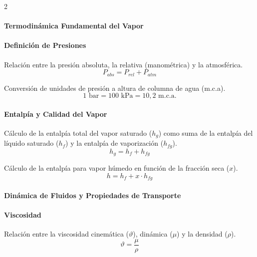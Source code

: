 \documentclass[11pt]{article}
\begin{document}
\begin{multicols*}{2}
    \paragraph*{Termodinámica Fundamental del Vapor}
    
    \paragraph*{Definición de Presiones}
    Relación entre la presión absoluta, la relativa (manométrica) y la atmosférica.
    \begin{equation}
        P_{abs} = P_{rel} + P_{atm}
    \end{equation}
    
    Conversión de unidades de presión a altura de columna de agua (m.c.a).
    \begin{equation}
        1 \text{ bar} = 100 \text{ kPa} = 10,2 \text{ m.c.a.}
    \end{equation}
    
    \paragraph*{Entalpía y Calidad del Vapor}
    Cálculo de la entalpía total del vapor saturado ($h_g$) como suma de la entalpía del líquido saturado ($h_f$) y la entalpía de vaporización ($h_{fg}$).
    \begin{equation}
        h_g = h_f + h_{fg}
    \end{equation}
    
    Cálculo de la entalpía para vapor húmedo en función de la fracción seca ($x$).
    \begin{equation}
        h = h_f + x \cdot h_{fg}
    \end{equation}
    
    \paragraph*{Dinámica de Fluidos y Propiedades de Transporte}
    
    \paragraph*{Viscosidad}
    Relación entre la viscosidad cinemática ($\vartheta$), dinámica ($\mu$) y la densidad ($\rho$).
    \begin{equation}
        \vartheta = \frac{\mu}{\rho}
    \end{equation}
    

\end{multicols*}
\end{document}
